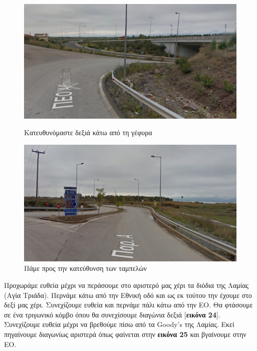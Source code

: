 \begin{figure}[H]
	\centering
		\includegraphics[width=\textwidth]{images/athina-lamia/lamia/lamia3.PNG}
			\caption{Κατευθυνόμαστε δεξιά κάτω από τη γέφυρα\newline}
	
	\centering
		\includegraphics[width=\textwidth]{images/athina-lamia/lamia/lamia4.PNG}
			\caption{Πάμε προς την κατεύθυνση των ταμπελών}
\end{figure}
Προχωράμε ευθεία μέχρι να περάσουμε στο αριστερό μας χέρι τα διόδια της Λαμίας (Αγία Τριάδα). Περνάμε κάτω από την Εθνική οδό και ως εκ τούτου την έχουμε στο δεξί μας χέρι. Συνεχίζουμε ευθεία και περνάμε πάλι κάτω από την ΕΟ. Θα φτάσουμε σε ένα τριγωνικό κόμβο όπου θα συνεχίσουμε διαγώνια δεξιά [\textbf{εικόνα 24}]. Συνεχίζουμε ευθεία μέχρι να βρεθούμε πίσω από τα Goody's της Λαμίας. Εκεί πηγαίνουμε διαγωνίως αριστερά όπως φαίνεται στην \textbf{εικόνα 25} και βγαίνουμε στην ΕΟ.
